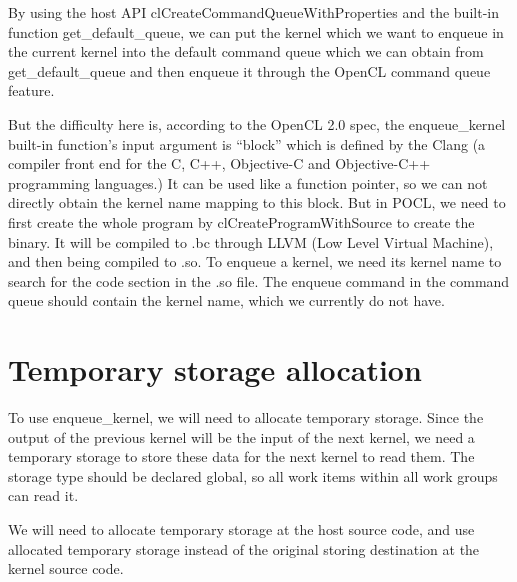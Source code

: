     By using the host API clCreateCommandQueueWithProperties and the built-in function get\_default\_queue, we can put the kernel which we want to enqueue in the current kernel into the default command queue which we can obtain from get\_default\_queue and then enqueue it through the OpenCL command queue feature.
	
    But the difficulty here is, according to the OpenCL 2.0 spec, the enqueue\_kernel built-in function’s input argument is “block” which is defined by the Clang\cite{clangori} (a compiler front end for the C, C++, Objective-C and Objective-C++ programming languages.) It can be used like a function pointer, so we can not directly obtain the kernel name mapping to this block. But in POCL, we need to first create the whole program by clCreateProgramWithSource to create the binary. It will be compiled to .bc through LLVM (Low Level Virtual Machine), and then being compiled to .so. To enqueue a kernel, we need its kernel name to search for the code section in the .so file. The enqueue command in the command queue should contain the kernel name, which we currently do not have.
	
\section{Temporary storage allocation}
    To use enqueue\_kernel, we will need to allocate temporary storage. Since the output of the previous kernel will be the input of the next kernel, we need a temporary storage to store these data for the next kernel to read them. The storage type should be declared global, so all work items within all work groups can read it.

    We will need to allocate temporary storage at the host source code, and use allocated temporary storage instead of the original storing destination at the kernel source code.
